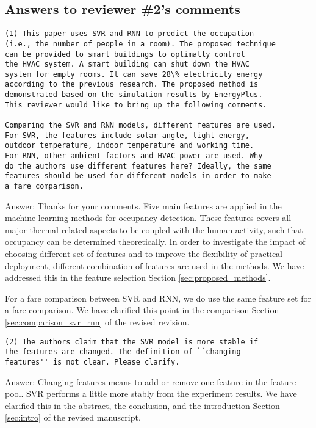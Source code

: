 \subsection{Answers to reviewer \#2's comments}
\begin{verbatim}
(1) This paper uses SVR and RNN to predict the occupation
(i.e., the number of people in a room). The proposed technique
can be provided to smart buildings to optimally control
the HVAC system. A smart building can shut down the HVAC
system for empty rooms. It can save 28\% electricity energy
according to the previous research. The proposed method is
demonstrated based on the simulation results by EnergyPlus.
This reviewer would like to bring up the following comments.

Comparing the SVR and RNN models, different features are used.
For SVR, the features include solar angle, light energy,
outdoor temperature, indoor temperature and working time.
For RNN, other ambient factors and HVAC power are used. Why
do the authors use different features here? Ideally, the same
features should be used for different models in order to make
a fare comparison.
\end{verbatim}

Answer:
Thanks for your comments. Five main features are applied in the machine learning methods for occupancy detection.
These features covers all major thermal-related aspects to be coupled with the human activity, such that
occupancy can be determined theoretically. In order to investigate the impact
of choosing different set of features and to improve the flexibility of practical
deployment, different combination of features are used in the methods. We have addressed this in the feature selection Section
\ref{sec:proposed_methods}.

For a fare comparison between SVR and RNN, we do use the same feature
set for a fare comparison. We have clarified this point in the comparison Section \ref{sec:comparison_svr_rnn} of the revised
revision.

\begin{verbatim}
(2) The authors claim that the SVR model is more stable if
the features are changed. The definition of ``changing
features'' is not clear. Please clarify.
\end{verbatim}

Answer: Changing features means to add or remove one feature in the feature pool. SVR
performs a little more stably from the experiment results. We have clarified
this in the abstract, the conclusion, and the introduction Section \ref{sec:intro} of the revised manuscript.

